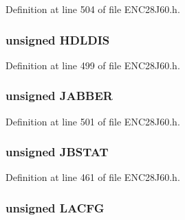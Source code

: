 Definition at line 504 of file E\+N\+C28\+J60.\+h.

\hypertarget{union_p_h_y_r_e_g_a405b0765d021672b9232e641833ae9df}{}
\subsubsection[{H\+D\+L\+D\+I\+S}]{\setlength{\rightskip}{0pt plus 5cm}unsigned H\+D\+L\+D\+I\+S}\label{union_p_h_y_r_e_g_a405b0765d021672b9232e641833ae9df}


Definition at line 499 of file E\+N\+C28\+J60.\+h.

\hypertarget{union_p_h_y_r_e_g_ab1f4a2fac885a718aaaf1b4804db4a27}{}
\subsubsection[{J\+A\+B\+B\+E\+R}]{\setlength{\rightskip}{0pt plus 5cm}unsigned J\+A\+B\+B\+E\+R}\label{union_p_h_y_r_e_g_ab1f4a2fac885a718aaaf1b4804db4a27}


Definition at line 501 of file E\+N\+C28\+J60.\+h.

\hypertarget{union_p_h_y_r_e_g_aee161acd192d864f8671b6c8cbf3f10d}{}
\subsubsection[{J\+B\+S\+T\+A\+T}]{\setlength{\rightskip}{0pt plus 5cm}unsigned J\+B\+S\+T\+A\+T}\label{union_p_h_y_r_e_g_aee161acd192d864f8671b6c8cbf3f10d}


Definition at line 461 of file E\+N\+C28\+J60.\+h.

\hypertarget{union_p_h_y_r_e_g_a4068b3545091b33a93a87b70e24ca5de}{}
\subsubsection[{L\+A\+C\+F\+G}]{\setlength{\rightskip}{0pt plus 5cm}unsigned L\+A\+C\+F\+G}\label{union_p_h_y_r_e_g_a4068b3545091b33a93a87b70e24ca5de}


